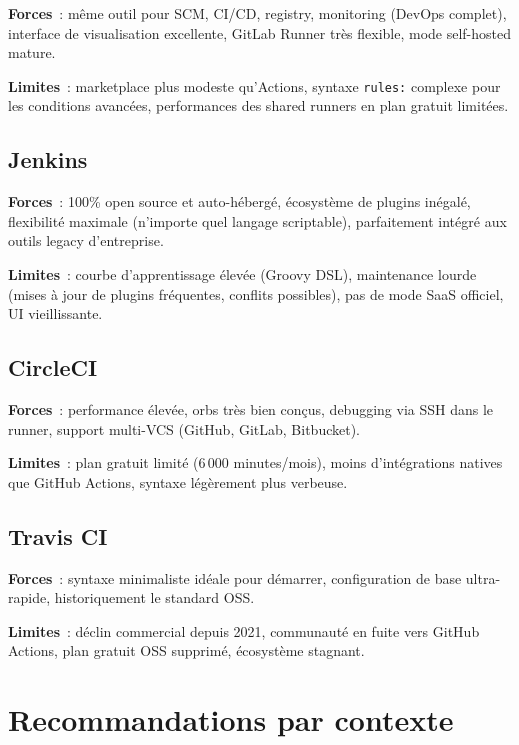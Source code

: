 \documentclass[12pt,a4paper]{report}
\begin{document}
\textbf{Forces}~: même outil pour SCM, CI/CD, registry, monitoring (DevOps
complet), interface de visualisation excellente, GitLab Runner très flexible,
mode self-hosted mature.

\textbf{Limites}~: marketplace plus modeste qu'Actions, syntaxe \texttt{rules:}
complexe pour les conditions avancées, performances des shared runners en
plan gratuit limitées.

\subsection{Jenkins}

\textbf{Forces}~: 100\% open source et auto-hébergé, écosystème de plugins
inégalé, flexibilité maximale (n'importe quel langage scriptable),
parfaitement intégré aux outils legacy d'entreprise.

\textbf{Limites}~: courbe d'apprentissage élevée (Groovy DSL), maintenance
lourde (mises à jour de plugins fréquentes, conflits possibles), pas de mode
SaaS officiel, UI vieillissante.

\subsection{CircleCI}

\textbf{Forces}~: performance élevée, orbs très bien conçus, debugging via
SSH dans le runner, support multi-VCS (GitHub, GitLab, Bitbucket).

\textbf{Limites}~: plan gratuit limité (6\,000 minutes/mois), moins d'intégrations
natives que GitHub Actions, syntaxe légèrement plus verbeuse.

\subsection{Travis CI}

\textbf{Forces}~: syntaxe minimaliste idéale pour démarrer, configuration de
base ultra-rapide, historiquement le standard OSS.

\textbf{Limites}~: déclin commercial depuis 2021, communauté en fuite vers
GitHub Actions, plan gratuit OSS supprimé, écosystème stagnant.

\section{Recommandations par contexte}
\end{document}
